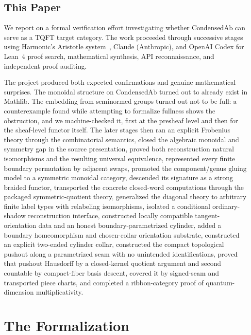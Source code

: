 \documentclass[11pt]{amsart}
\theoremstyle{plain}
\theoremstyle{definition}
\newcommand{\CondAb}{\mathrm{CondensedAb}}
\begin{document}
\subsection{This Paper}

We report on a formal verification effort investigating whether $\CondAb$ can serve as a TQFT target category. The work proceeded through successive stages using Harmonic's Aristotle system~\cite{Aristotle2025}, Claude (Anthropic), and OpenAI Codex for Lean~4 proof search, mathematical synthesis, API reconnaissance, and independent proof auditing.

The project produced both expected confirmations and genuine mathematical surprises. The monoidal structure on $\CondAb$ turned out to already exist in Mathlib. The embedding from seminormed groups turned out not to be full: a counterexample found while attempting to formalize fullness shows the obstruction, and we machine-checked it, first at the presheaf level and then for the sheaf-level functor itself. The later stages then ran an explicit Frobenius theory through the combinatorial semantics, closed the algebraic monoidal and symmetry gap in the source presentation, proved both reconstruction natural isomorphisms and the resulting universal equivalence, represented every finite boundary permutation by adjacent swaps, promoted the component/genus gluing model to a symmetric monoidal category, descended its signature as a strong braided functor, transported the concrete closed-word computations through the packaged symmetric-quotient theory, generalized the diagonal theory to arbitrary finite label types with relabeling isomorphisms, isolated a conditional ordinary-shadow reconstruction interface, constructed locally compatible tangent-orientation data and an honest boundary-parametrized cylinder, added a boundary homeomorphism and chosen-collar orientation substrate, constructed an explicit two-ended cylinder collar, constructed the compact topological pushout along a parametrized seam with no unintended identifications, proved that pushout Hausdorff by a closed-kernel quotient argument and second countable by compact-fiber basis descent, covered it by signed-seam and transported piece charts, and completed a ribbon-category proof of quantum-dimension multiplicativity.

\section{The Formalization}
\label{sec:sessions}
\end{document}
